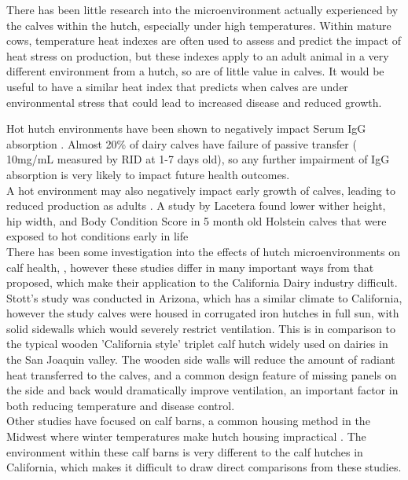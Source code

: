 \documentclass[12pt]{article}
\begin{document}
	There has been little research into the microenvironment actually experienced by the calves within the hutch, especially under high temperatures. 
	Within mature cows, temperature heat indexes are often used to assess and predict the impact of heat stress on production\cite{Bohmanova2007}, but these indexes apply to an adult animal in a very different environment from a hutch, so are of little value in calves.
	It would be useful to have a similar heat index that predicts when calves are under environmental stress that could lead to increased disease and reduced growth.


	Hot hutch environments have been shown to negatively impact Serum IgG absorption \cite{Stott1976}. Almost 20\% of dairy calves have failure of passive transfer (\< 10mg/mL measured by RID at 1-7 days old)\cite{NAHMS2007}, so any further impairment of IgG absorption is very likely to impact future health outcomes.\cite{Besser1994}\\
	A hot environment may also negatively impact early growth of calves, leading to reduced production as adults \cite{Hoffman1997}. A study by  Lacetera found lower wither height, hip width, and Body Condition Score in 5 month old Holstein calves that were exposed to hot conditions early in life \cite{lacetera1994} \\
	\newpage
	There has been some investigation into the effects of hutch microenvironments on calf health, \cite{Stott1976,Nordlund2008,Lago2006}, however these studies differ  in many important ways from that proposed, which make their application to the California Dairy industry difficult.\\ 
	Stott's study was conducted in Arizona, which has a similar climate to California, however the study calves were housed in corrugated iron hutches in full sun, with solid sidewalls which would severely restrict ventilation\cite{Stott1976}. This is in comparison to the typical wooden 'California style' triplet calf hutch widely used on dairies in the San Joaquin valley. The wooden side walls will reduce the amount of radiant heat transferred to the calves, and a common design feature of missing panels on the side and back would dramatically improve ventilation, an important factor in both reducing temperature and disease control\cite{Smith2002a}.\\
	Other studies have focused on calf barns, a common housing method in the Midwest where winter temperatures make hutch housing impractical \cite{Lago2006}. The environment within these calf barns is very different to the calf hutches in California, which makes it difficult to draw direct comparisons from these studies.\\
\end{document}
